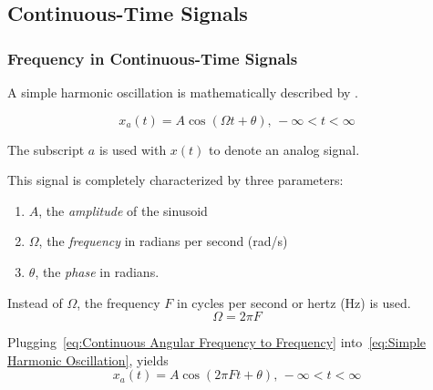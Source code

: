 \subsection{Continuous-Time Signals}\label{subsec:Continuous-Time Signals}
\subsubsection{Frequency in Continuous-Time Signals}\label{subsubsec:Frequency in Continuous-Time Signals}
A simple harmonic oscillation is mathematically described by .

\begin{equation}\label{eq:Simple Harmonic Oscillation}
  x_{a}(t) = A \cos \left( \Omega t + \theta \right) \text{, } -\infty < t < \infty
\end{equation}

\begin{remark*}
  The subscript $a$ is used with $x(t)$ to denote an analog signal.
\end{remark*}

This signal is completely characterized by three parameters:
\begin{enumerate}[noitemsep]
\item $A$, the \emph{amplitude} of the sinusoid
\item $\Omega$, the \emph{frequency} in radians per second (\si{\radian / \second})
\item $\theta$, the \emph{phase} in radians.
\end{enumerate}

Instead of $\Omega$, the frequency $F$ in cycles per second or hertz (\si{\hertz}) is used.
\begin{equation}\label{eq:Continuous Angular Frequency to Frequency}
  \Omega = 2 \pi F
\end{equation}

Plugging~\eqref{eq:Continuous Angular Frequency to Frequency} into~\eqref{eq:Simple Harmonic Oscillation}, yields
\begin{equation}\label{eq:Frequency Harmonic Oscillation}
  x_{a}(t) = A \cos \left( 2 \pi Ft + \theta \right) \text{, } -\infty < t < \infty
\end{equation}

